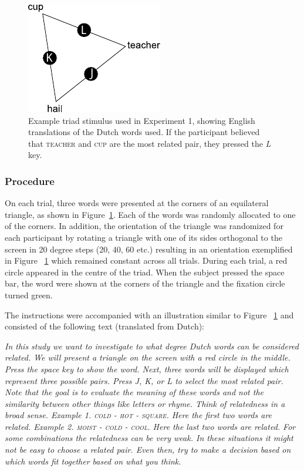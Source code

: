 \documentclass[doc]{apa6}
\newcommand{\stimulus}[1]{\textsc{#1}}
\begin{document}
\begin{figure}[t]
\centering
\includegraphics[]{images/triadExample.pdf}
\caption{\small{Example triad stimulus used in Experiment 1, showing English translations of the Dutch words used. If the participant believed that \stimulus{teacher} and \stimulus{cup} are the most related pair, they pressed the \textit{L} key.}}
\label{figure:ExampleTriad}
\end{figure}


\subsubsection{Procedure}
On each trial, three words were presented at the corners of an equilateral triangle, as shown in Figure~\ref{figure:ExampleTriad}. Each of the words was randomly allocated to one of the corners. In addition, the orientation of the triangle was randomized for each participant by rotating a triangle with one of its sides orthogonal to the screen in 20 degree steps (20, 40, 60 etc.) resulting in an orientation exemplified in Figure ~\ref{figure:ExampleTriad} which remained constant across all trials. During each trial, a red circle appeared in the centre of the triad. When the subject pressed the space bar, the word were shown at the corners of the triangle and the fixation circle turned green.

The instructions were accompanied with an illustration similar to Figure ~\ref{figure:ExampleTriad} and consisted of the following text (translated from Dutch):

\textit{In this study we want to investigate to what degree Dutch words can be considered related.
We will present a triangle on the screen with a red circle in the middle.
Press the space key to show the word. Next, three words will be displayed which represent three possible pairs. Press J, K, or L to select the most related pair. Note that the goal is to evaluate the meaning of these words and not the similarity between other things like letters or rhyme.
Think of relatedness in a broad sense.
Example 1.  \stimulus{cold} - \stimulus{hot} - \stimulus{square}. Here the first two words are related.
Example 2.  \stimulus{moist} - \stimulus{cold} - \stimulus{cool}. Here the last two words are related.
For some combinations the relatedness can be very weak. In these situations it might not be easy to choose a related pair. Even then, try to make a decision based on which words fit together based on what you think.}
\end{document}
